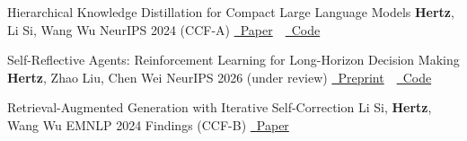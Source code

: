 

\publicationItem
{Hierarchical Knowledge Distillation for Compact Large Language Models}
{\textbf{Hertz}, Li Si, Wang Wu}
{NeurIPS 2024 (CCF-A)}
{\href{https://arxiv.org/abs/2410.xxxxx}{\faFilePdf\ Paper}\ \,
 \href{https://github.com/hertz/hkd-llm}{\faGithub\ Code}}

\publicationItem
{Self-Reflective Agents: Reinforcement Learning for Long-Horizon Decision Making}
{\textbf{Hertz}, Zhao Liu, Chen Wei}
{NeurIPS 2026 (under review)}
{\href{https://arxiv.org/abs/2510.xxxxx}{\faFilePdf\ Preprint}\ \,
 \href{https://github.com/hertz/agent-rl-framework}{\faGithub\ Code}}

\publicationItem
{Retrieval-Augmented Generation with Iterative Self-Correction}
{Li Si, \textbf{Hertz}, Wang Wu}
{EMNLP 2024 Findings (CCF-B)}
{\href{https://arxiv.org/abs/2406.xxxxx}{\faFilePdf\ Paper}}

\vspace{0.2em}



